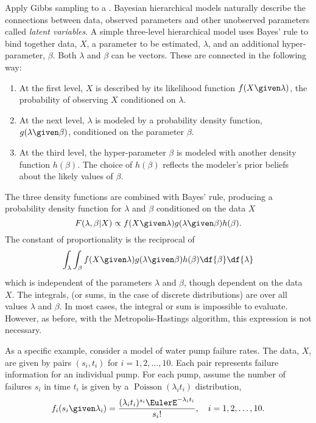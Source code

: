 \documentclass[12pt]{article}
\begin{document}
Apply Gibbs sampling  to a .%
Bayesian hierarchical models naturally describe the connections between
data, observed parameters and other unobserved parameters 
called \emph{latent variables}.  A simple three-level hierarchical model
uses Bayes' rule to bind together data, \( X \), a parameter to be
estimated, \( \lambda \), and an additional hyper-parameter, \( \beta \).
Both \( \lambda \) and \( \beta \) can be vectors.  These are connected
in the following way:
\begin{enumerate}
    \item
        At the first level, \( X \) is described by its likelihood
        function \( f(X \given \lambda) \), the probability of observing
        \( X \) conditioned on \( \lambda \).
    \item
        At the next level, \( \lambda \) is modeled by a probability
        density function, \( g(\lambda \given \beta) \), conditioned on
        the parameter \( \beta \).
    \item
        At the third level, the hyper-parameter \( \beta \) is modeled
        with another density function \( h(\beta) \).  The choice of \(
        h(\beta) \) reflects the modeler's prior beliefs about the
        likely values of \( \beta \).
\end{enumerate}
The three density functions are combined with Bayes' rule, producing a
probability density function for \( \lambda \) and \( \beta \)
conditioned on the data \( X \)
\[
    F(\lambda, \beta | X) \propto f(X \given \lambda) g(\lambda \given
    \beta) h(\beta).
\] The constant of proportionality is the reciprocal of
\[
    \int_{\lambda} \int_{\beta} f(X \given \lambda) g(\lambda \given
    \beta) h(\beta) \df{\beta} \df{\lambda}
\] which is independent of the parameters \( \lambda \) and \( \beta \),
though dependent on the data \( X \).  The integrals, (or sums, in the
case of discrete distributions) are over all values \( \lambda \) and \(
\beta \).  In most cases, the integral or sum is impossible to evaluate.
However, as before, with the Metropolis-Hastings algorithm, this
expression is not necessary.

As a specific example, consider a model of water pump failure rates. The
data, \( X \), are given by pairs \( (s_i, t_i) \) for \( i = 1,2, \dots,
10 \).  Each pair represents failure information for an individual pump.
For each pump, assume the number of failures \( s_i \) in time \( t_i \)
is given by a \(
\operatorname{Poisson}
(\lambda_i t_i) \) distribution,
\[
    f_i(s_i \given \lambda_i) = \frac{(\lambda_i t_i)^{s_i} \EulerE^{-\lambda_i
    t_i}}{s_i!}, \quad i = 1,2, \dots, 10.
\]
\end{document}
